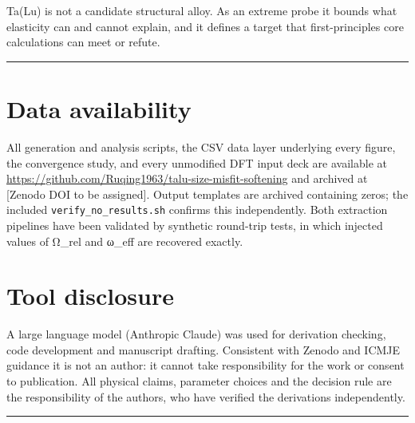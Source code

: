 Ta(Lu) is not a candidate structural alloy. As an extreme probe it bounds what elasticity can and cannot explain, and it defines a target that first-principles core calculations can meet or refute.

\begin{center}\rule{0.5\linewidth}{0.5pt}\end{center}

\hypertarget{data-availability}{%
\section*{Data availability}\label{sec:data-availability}}

All generation and analysis scripts, the CSV data layer underlying every figure, the convergence study, and every unmodified DFT input deck are available at \url{https://github.com/Ruqing1963/talu-size-misfit-softening} and archived at {[}Zenodo DOI to be assigned{]}. Output templates are archived containing zeros; the included \texttt{verify\_no\_results.sh} confirms this independently. Both extraction pipelines have been validated by synthetic round-trip tests, in which injected values of Ω\_rel and ω\_eff are recovered exactly.

\hypertarget{tool-disclosure}{%
\section*{Tool disclosure}\label{sec:tool-disclosure}}

A large language model (Anthropic Claude) was used for derivation checking, code development and manuscript drafting. Consistent with Zenodo and ICMJE guidance it is not an author: it cannot take responsibility for the work or consent to publication. All physical claims, parameter choices and the decision rule are the responsibility of the authors, who have verified the derivations independently.

\begin{center}\rule{0.5\linewidth}{0.5pt}\end{center}

